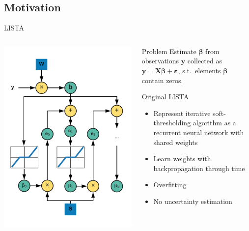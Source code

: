 \documentclass[9pt]{beamer}
\begin{document}
\subsection{Motivation}
\begin{frame}{LISTA}
  \begin{columns}
  \begin{column}{0.33\textwidth}
      \centering
      \includegraphics[width=0.75\columnwidth]{graphics/LISTA_main.pdf}
    \end{column}
    \begin{column}{0.67\textwidth}
  \begin{block}{Problem}
      Estimate \(\boldsymbol\beta \) from observations \(\mathbf{y}\) collected as \(\mathbf{y} = \mathbf{X} \boldsymbol\beta + \boldsymbol\varepsilon\), s.t.\ elements \(\boldsymbol\beta \) contain zeros.
  \end{block}



    \begin{block}{Original LISTA}
      \begin{itemize}
        \item Represent iterative soft-thresholding algorithm as a recurrent neural network with shared weights
        \item Learn weights with backpropagation through time
        \item {\color{red}Overfitting}
        \item {\color{red}No uncertainty estimation}
      \end{itemize}
    \end{block}


\end{column}
\end{columns}
\end{frame}
\end{document}
